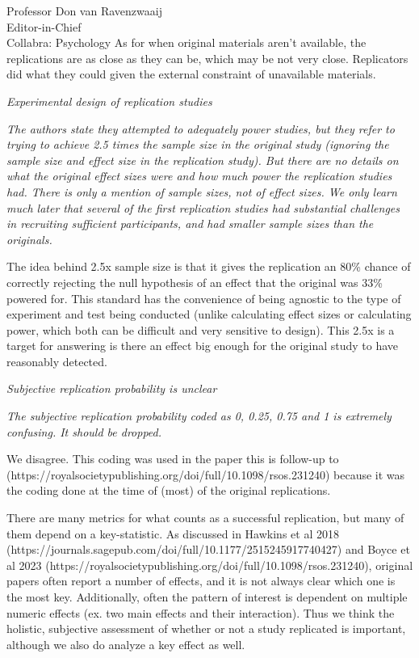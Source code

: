 \documentclass{stanfordletter}
\newcommand{\theysaid}[1]{\begin{leftbar} \noindent 
		\textsl{ #1}\end{leftbar}}
\begin{document}
\begin{letter}{Professor Don van Ravenzwaaij \\ Editor-in-Chief \\ Collabra: Psychology }
		As for when original materials aren't available, the replications are as close as they can be, which may be not very close. Replicators did what they could given the external constraint of unavailable materials. 
		
		
		\theysaid{Experimental design of replication studies}
		\theysaid{The authors state they attempted to adequately power studies, but they refer to trying to achieve 2.5 times the sample size in the original study (ignoring the sample size and effect size in the replication study). But there are no details on what the original effect sizes were and how much power the replication studies had. There is only a mention of sample sizes, not of effect sizes. We only learn much later that several of the first replication studies had substantial challenges in recruiting sufficient participants, and had smaller sample sizes than the originals.}
		
		The idea behind 2.5x sample size is that it gives the replication an 80\% chance of correctly rejecting the null hypothesis of an effect that the original was 33\% powered for. This standard has the convenience of being agnostic to the type of experiment and test being conducted (unlike calculating effect sizes or calculating power, which both can be difficult and very sensitive to design). This 2.5x is a target for answering is there an effect big enough for the original study to have reasonably detected. 
		
		
		\theysaid{Subjective replication probability is unclear}
		\theysaid{The subjective replication probability coded as 0, 0.25, 0.75 and 1 is extremely confusing. It should be dropped.}
		
		We disagree. This coding was used in the paper this is follow-up to (https://royalsocietypublishing.org/doi/full/10.1098/rsos.231240) because it was the coding done at the time of (most) of the original replications. 
		
		There are many metrics for what counts as a successful replication, but many of them depend on a key-statistic. As discussed in Hawkins et al 2018 (https://journals.sagepub.com/doi/full/10.1177/2515245917740427) and Boyce et al 2023 (https://royalsocietypublishing.org/doi/full/10.1098/rsos.231240), original papers often report a number of effects, and it is not always clear which one is the most key. Additionally, often the pattern of interest is dependent on multiple numeric effects (ex. two main effects and their interaction). Thus we think the holistic, subjective assessment of whether or not a study replicated is important, although we also do analyze a key effect as well. 
		

\end{letter}
\end{document}
